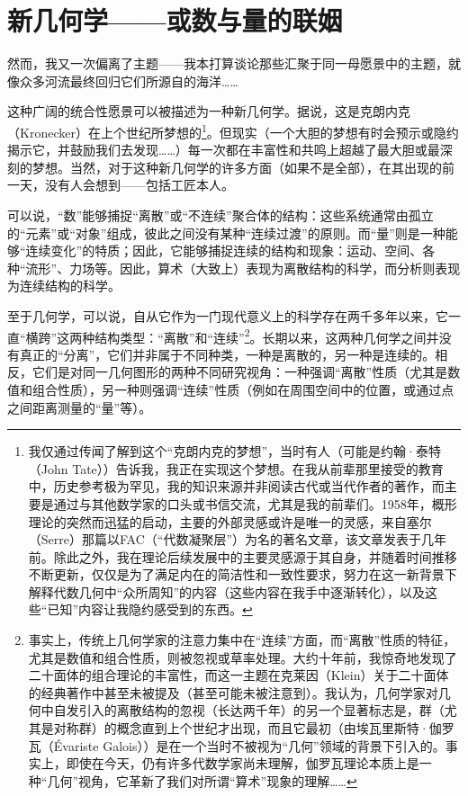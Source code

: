 \section{新几何学——或数与量的联姻}

然而，我又一次偏离了主题——我本打算谈论那些汇聚于同一母愿景中的主题，就像众多河流最终回归它们所源自的海洋……

这种广阔的统合性愿景可以被描述为一种新几何学。据说，这是克朗内克（Kronecker）在上个世纪所梦想的\footnote{我仅通过传闻了解到这个“克朗内克的梦想”，当时有人（可能是约翰·泰特（John Tate））告诉我，我正在实现这个梦想。在我从前辈那里接受的教育中，历史参考极为罕见，我的知识来源并非阅读古代或当代作者的著作，而主要是通过与其他数学家的口头或书信交流，尤其是我的前辈们。1958年，概形理论的突然而迅猛的启动，主要的外部灵感或许是唯一的灵感，来自塞尔（Serre）那篇以FAC（“代数凝聚层”）为名的著名文章，该文章发表于几年前。除此之外，我在理论后续发展中的主要灵感源于其自身，并随着时间推移不断更新，仅仅是为了满足内在的简洁性和一致性要求，努力在这一新背景下解释代数几何中“众所周知”的内容（这些内容在我手中逐渐转化），以及这些“已知”内容让我隐约感受到的东西。}。但现实（一个大胆的梦想有时会预示或隐约揭示它，并鼓励我们去发现……）每一次都在丰富性和共鸣上超越了最大胆或最深刻的梦想。当然，对于这种新几何学的许多方面（如果不是全部），在其出现的前一天，没有人会想到——包括工匠本人。

可以说，“数”能够捕捉“离散”或“不连续”聚合体的结构：这些系统通常由孤立的“元素”或“对象”组成，彼此之间没有某种“连续过渡”的原则。而“量”则是一种能够“连续变化”的特质；因此，它能够捕捉连续的结构和现象：运动、空间、各种“流形”、力场等。因此，算术（大致上）表现为离散结构的科学，而分析则表现为连续结构的科学。

至于几何学，可以说，自从它作为一门现代意义上的科学存在两千多年以来，它一直“横跨”这两种结构类型：“离散”和“连续”\footnote{事实上，传统上几何学家的注意力集中在“连续”方面，而“离散”性质的特征，尤其是数值和组合性质，则被忽视或草率处理。大约十年前，我惊奇地发现了二十面体的组合理论的丰富性，而这一主题在克莱因（Klein）关于二十面体的经典著作中甚至未被提及（甚至可能未被注意到）。我认为，几何学家对几何中自发引入的离散结构的忽视（长达两千年）的另一个显著标志是，群（尤其是对称群）的概念直到上个世纪才出现，而且它最初（由埃瓦里斯特·伽罗瓦（Évariste Galois））是在一个当时不被视为“几何”领域的背景下引入的。事实上，即使在今天，仍有许多代数学家尚未理解，伽罗瓦理论本质上是一种“几何”视角，它革新了我们对所谓“算术”现象的理解……}。长期以来，这两种几何学之间并没有真正的“分离”，它们并非属于不同种类，一种是离散的，另一种是连续的。相反，它们是对同一几何图形的两种不同研究视角：一种强调“离散”性质（尤其是数值和组合性质），另一种则强调“连续”性质（例如在周围空间中的位置，或通过点之间距离测量的“量”等）。

